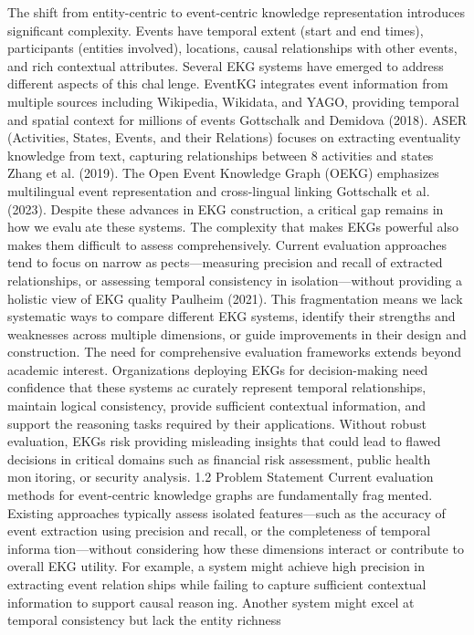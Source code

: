 The shift from entity-centric to event-centric knowledge representation introduces
significant complexity. Events have temporal extent (start and end times), participants
(entities involved), locations, causal relationships with other events, and rich contextual
attributes. Several EKG systems have emerged to address different aspects of this challenge. EventKG integrates event information from multiple sources including Wikipedia,
Wikidata, and YAGO, providing temporal and spatial context for millions of events
Gottschalk and Demidova (2018). ASER (Activities, States, Events, and their Relations)
focuses on extracting eventuality knowledge from text, capturing relationships between
8
activities and states Zhang et al. (2019). The Open Event Knowledge Graph (OEKG)
emphasizes multilingual event representation and cross-lingual linking Gottschalk et al.
(2023).
Despite these advances in EKG construction, a critical gap remains in how we evaluate these systems. The complexity that makes EKGs powerful also makes them difficult
to assess comprehensively. Current evaluation approaches tend to focus on narrow aspects—measuring precision and recall of extracted relationships, or assessing temporal
consistency in isolation—without providing a holistic view of EKG quality Paulheim
(2021). This fragmentation means we lack systematic ways to compare different EKG
systems, identify their strengths and weaknesses across multiple dimensions, or guide
improvements in their design and construction.
The need for comprehensive evaluation frameworks extends beyond academic interest.
Organizations deploying EKGs for decision-making need confidence that these systems accurately represent temporal relationships, maintain logical consistency, provide sufficient
contextual information, and support the reasoning tasks required by their applications.
Without robust evaluation, EKGs risk providing misleading insights that could lead to
flawed decisions in critical domains such as financial risk assessment, public health monitoring, or security analysis.
1.2 Problem Statement
Current evaluation methods for event-centric knowledge graphs are fundamentally fragmented. Existing approaches typically assess isolated features—such as the accuracy of
event extraction using precision and recall, or the completeness of temporal information—without considering how these dimensions interact or contribute to overall EKG
utility. For example, a system might achieve high precision in extracting event relationships while failing to capture sufficient contextual information to support causal reasoning. Another system might excel at temporal consistency but lack the entity richness
